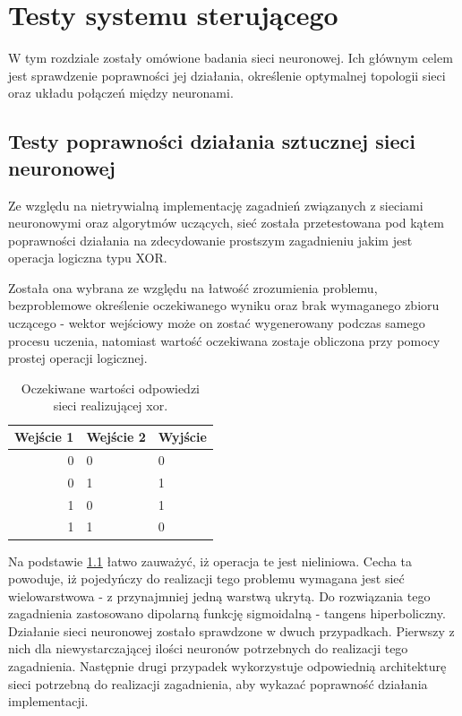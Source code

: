 \chapter{Testy systemu sterującego}
\label{cha:testy}

W tym rozdziale zostały omówione badania sieci neuronowej. Ich głównym celem jest sprawdzenie poprawności jej działania, określenie optymalnej topologii sieci oraz układu połączeń między neuronami.

\section{Testy poprawności działania sztucznej sieci neuronowej}

Ze względu na nietrywialną implementację zagadnień związanych z sieciami neuronowymi oraz algorytmów uczących, sieć została przetestowana pod kątem poprawności działania na zdecydowanie prostszym zagadnieniu jakim jest operacja logiczna typu XOR.

Została ona wybrana ze względu na łatwość zrozumienia problemu, bezproblemowe określenie oczekiwanego wyniku oraz brak wymaganego zbioru uczącego - wektor wejściowy może on zostać wygenerowany podczas samego procesu uczenia, natomiast wartość oczekiwana zostaje obliczona przy pomocy prostej operacji logicznej.

\begin{table}
\centering
\label{tab:expected_xor_output}
\begin{tabular}{|r|l|l|}
  \hline 
  Wejście 1 & Wejście 2 & Wyjście \\
  \hline 
  0 & 0 & 0 \\
  \hline
  0 & 1 & 1 \\
  \hline
  1 & 0 & 1 \\
  \hline
  1 & 1 & 0 \\
  \hline
\end{tabular}
\caption{Oczekiwane wartości odpowiedzi sieci realizującej xor.}
\end{table}

Na podstawie \ref{tab:expected_xor_output} łatwo zauważyć, iż operacja te jest nieliniowa. Cecha ta powoduje, iż pojedyńczy do realizacji tego problemu wymagana jest sieć wielowarstwowa - z przynajmniej jedną warstwą ukrytą. Do rozwiązania tego zagadnienia zastosowano dipolarną funkcję sigmoidalną - tangens hiperboliczny.
Działanie sieci neuronowej zostało sprawdzone w dwuch przypadkach. Pierwszy z nich dla niewystarczającej ilości neuronów potrzebnych do realizacji tego zagadnienia. Następnie drugi przypadek wykorzystuje odpowiednią architekturę sieci potrzebną do realizacji zagadnienia, aby wykazać poprawność działania implementacji.

